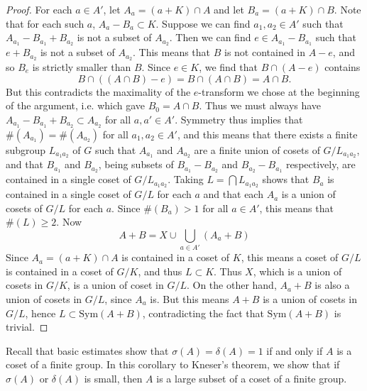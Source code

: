 \begin{proof}
    For each $a \in A'$, let $A_a = (a + K) \cap A$ and let $B_a = (a + K) \cap B$. Note that for each such $a$, $A_a - B_a \subset K$. Suppose we can find $a_1,a_2 \in A'$ such that $A_{a_1} - B_{a_1} + B_{a_2}$ is not a subset of $A_{a_2}$. Then we can find $e \in A_{a_1} - B_{a_1}$ such that $e + B_{a_2}$ is not a subset of $A_{a_2}$. This means that $B$ is not contained in $A - e$, and so $B_e$ is strictly smaller than $B$. Since $e \in K$, we find that $B \cap (A - e)$ contains
    \[ B \cap ((A \cap B) - e) = B \cap (A \cap B) = A \cap B. \]
    But this contradicts the maximality of the $e$-transform we chose at the beginning of the argument, i.e. which gave $B_0 = A \cap B$. Thus we must always have $A_{a_1} - B_{a_1} + B_{a_2} \subset A_{a_2}$ for all $a,a' \in A'$. Symmetry thus implies that $\#(A_{a_1}) = \#(A_{a_2})$ for all $a_1,a_2 \in A'$, and this means that there exists a finite subgroup $L_{a_1a_2}$ of $G$ such that $A_{a_1}$ and $A_{a_2}$ are a finite union of cosets of $G/L_{a_1a_2}$, and that $B_{a_1}$ and $B_{a_2}$, being subsets of $B_{a_1} - B_{a_2}$ and $B_{a_2} - B_{a_1}$ respectively, are contained in a single coset of $G/L_{a_1a_2}$. Taking $L = \bigcap L_{a_1a_2}$ shows that $B_a$ is contained in a single coset of $G/L$ for each $a$ and that each $A_a$ is a union of cosets of $G/L$ for each $a$. Since $\#(B_a) > 1$ for all $a \in A'$, this means that $\#(L) \geq 2$. Now
    \[ A + B = X \cup \bigcup_{a \in A'} (A_a + B) \]
    Since $A_a = (a + K) \cap A$ is contained in a coset of $K$, this means a coset of $G/L$ is contained in a coset of $G/K$, and thus $L \subset K$. Thus $X$, which is a union of cosets in $G/K$, is a union of coset in $G/L$. On the other hand, $A_a + B$ is also a union of cosets in $G/L$, since $A_a$ is. But this means $A + B$ is a union of cosets in $G/L$, hence $L \subset \text{Sym}(A + B)$, contradicting the fact that $\text{Sym}(A + B)$ is trivial.
\end{proof}

Recall that basic estimates show that $\sigma(A) = \delta(A) = 1$ if and only if $A$ is a coset of a finite group. In this corollary to Kneser's theorem, we show that if $\sigma(A)$ or $\delta(A)$ is small, then $A$ is a large subset of a coset of a finite group.

